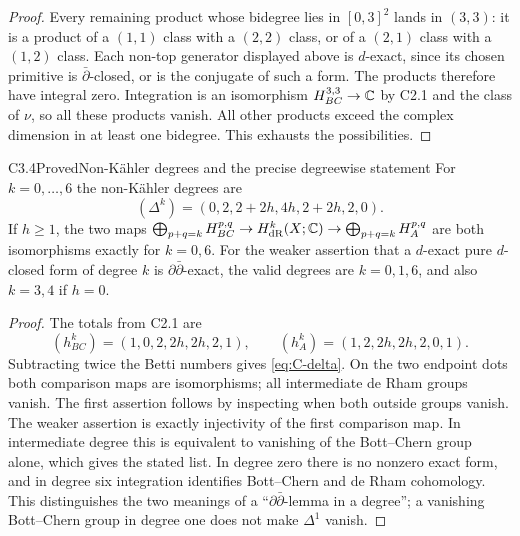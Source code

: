 \begin{proof}
Every remaining product whose bidegree lies in $[0,3]^2$ lands in
$(3,3)$: it is a product of a $(1,1)$ class with a $(2,2)$ class,
or of a $(2,1)$ class with a $(1,2)$ class.  Each non-top generator
displayed above is $d$-exact, since its chosen primitive is
$\bar\partial$-closed, or is the conjugate of such a form.
The products therefore have integral zero.  Integration is an
isomorphism $H^{3,3}_{BC}\to\mathbb C$ by C2.1 and the class of $\nu$,
so all these products vanish.  All other products exceed the complex
dimension in at least one bidegree.  This exhausts the possibilities.
\end{proof}

\begin{claim}{C3.4}{Proved}{Non-K\"ahler degrees and the precise degreewise statement}
For $k=0,\ldots,6$ the non-K\"ahler degrees are
\begin{equation}\label{eq:C-delta}
(\Delta^k)=(0,2,2+2h,4h,2+2h,2,0).
\end{equation}
If $h\ge1$, the two maps
$\bigoplus_{p+q=k}H^{p,q}_{BC}\to H^k_{\mathrm{dR}}(X;\mathbb C)
\to\bigoplus_{p+q=k}H^{p,q}_A$
are both isomorphisms exactly for $k=0,6$.
For the weaker assertion that a $d$-exact pure $d$-closed form of
degree $k$ is $\partial\bar\partial$-exact, the valid degrees are
$k=0,1,6$, and also $k=3,4$ if $h=0$.
\end{claim}
\begin{proof}
The totals from C2.1 are
\[
(h^k_{BC})=(1,0,2,2h,2h,2,1),\qquad
(h^k_A)=(1,2,2h,2h,2,0,1).
\]
Subtracting twice the Betti numbers gives \eqref{eq:C-delta}.
On the two endpoint dots both comparison maps are isomorphisms;
all intermediate de Rham groups vanish.  The first assertion follows
by inspecting when both outside groups vanish.  The weaker assertion
is exactly injectivity of the first comparison map.  In intermediate
degree this is equivalent to vanishing of the Bott--Chern group alone,
which gives the stated list.  In degree zero there is no nonzero
exact form, and in degree six integration identifies Bott--Chern and
de Rham cohomology.  This distinguishes the two meanings of a
``$\partial\bar\partial$-lemma in a degree''; a vanishing Bott--Chern
group in degree one does not make $\Delta^1$ vanish.
\end{proof}

